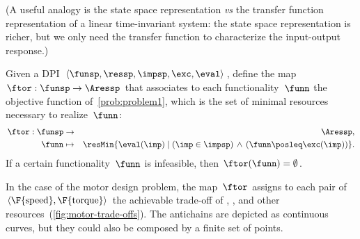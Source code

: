 (A useful analogy is the state space representation \emph{vs} the
transfer function representation of a linear time-invariant system:
the state space representation is richer, but we only need the transfer
function to characterize the input-output response.)
\begin{definition}
\label{def:ftor}Given a DPI $\left\langle \funsp,\ressp,\impsp,\exc,\eval\right\rangle $,
define the map~$\ftor:\funsp\rightarrow\Aressp$ that associates
to each functionality~$\funn$ the objective function of~\cref{prob:problem1},
which is the set of minimal resources necessary to realize~$\funn$:
\begin{eqnarray*}
\ftor:\funsp & \rightarrow & \Aressp,\\
\funn& \mapsto & \resMin\{\eval(\imp)\mid\left(\imp\in\impsp\right)\,\wedge\,\left(\funn\posleq\exc(\imp)\right)\}.
\end{eqnarray*}
If a certain functionality~$\funn$ is infeasible, then $\ftor(\funn)=\emptyset$.
\end{definition}

\begin{example}
In the case of the motor design problem, the map~$\ftor$ assigns
to each pair of $\left\langle \F{\text{speed}},\F{\text{torque}}\right\rangle $
the achievable trade-off of , , and other resources~(\cref{fig:motor-trade-offs}).
The antichains are depicted as continuous curves, but they could also
be composed by a finite set of points.

\end{example}

